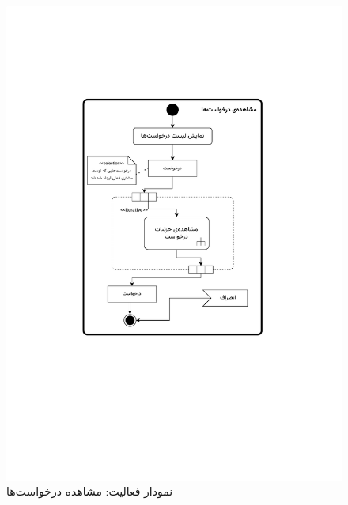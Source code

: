 \begin{figure}
	\centering
	\includegraphics[scale=0.8, page=1]{figs/OOD-activity11-20.pdf}
	\caption{نمودار فعالیت: مشاهده درخواست‌ها}
\end{figure}
\FloatBarrier
\newpage

